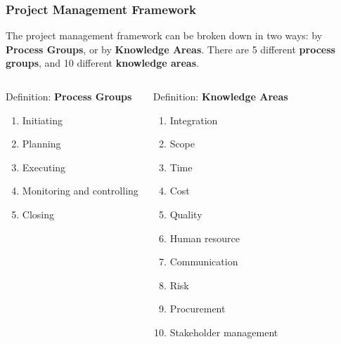 \documentclass{beamer}
\begin{document}
\begin{frame}
\frametitle{Project Management Framework}
The project management framework can be broken down in two ways: by \textbf{Process Groups}, or by \textbf{Knowledge Areas}. There are 5 different \textbf{process groups}, and 10 different \textbf{knowledge areas}.
\vspace{0.15cm}
\begin{columns}[t]
\begin{block}{Definition: \textbf{Process Groups}}
\begin{enumerate} \footnotesize
\item Initiating
\item Planning
\item Executing
\item Monitoring and controlling
\item Closing
\end{enumerate}
\end{block}
\begin{block}{Definition: \textbf{Knowledge Areas}}
\begin{enumerate} \footnotesize
\item Integration
\item Scope
\item Time
\item Cost
\item Quality
\item Human resource
\item Communication
\item Risk
\item Procurement
\item Stakeholder management
\end{enumerate}
\end{block}
\end{columns}
\end{frame}
\end{document}
